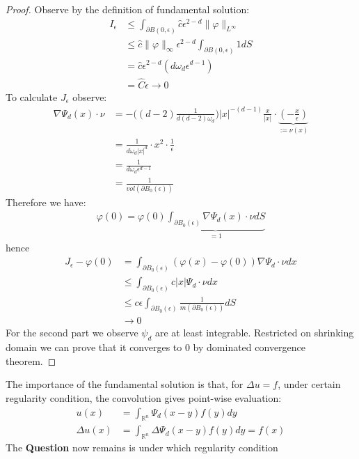\documentclass[a4paper,11pt,oneside,fleqn]{book}
\theoremstyle{definition}
\theoremstyle{remark}
\begin{document}
\begin{proof}
	Observe by the definition of fundamental solution:
	\begin{align*}
		I_\epsilon &\le  \int_{\partial B(0, \epsilon)} \hat{c} \epsilon^{2 - d} \|\varphi\|_{L^\infty}  \\
		&\leq \hat{c} \|\varphi\|_\infty \epsilon^{2-d} \int_{\partial B(0, \epsilon)} 1 dS\\
		&= \hat{c} \epsilon^{2 - d} (d \omega_{d} \epsilon^{d - 1})\\
		&= \hat{C} \epsilon \rightarrow 0
	\end{align*}
To calculate $J_\epsilon$ observe:
	\begin{align*}
		\nabla \Psi_d(x) \cdot \nu &= -\bigg( (d-2) \frac{1}{d(d-2)\omega_d} \bigg) |x|^{-(d-1)}  \frac{x}{|x|} \cdot \underbrace{ (-\frac{x}{\epsilon}) }_{:= \nu(x)}\\
		&= \frac{1}{d\omega_d |x|^d} \cdot x^2 \cdot \frac{1}{\epsilon}\\
		&= \frac{1}{d\omega_d \epsilon^{d - 1} }\\
		&= \frac{1}{vol(\partial B_0(\epsilon))}
	\end{align*}
	Therefore we have:
	\begin{align*}
		\varphi(0) = \varphi(0) \underbrace{ \int_{\partial B_0(\epsilon)} \nabla \Psi_d(x) \cdot \nu dS}_{ = 1}
	\end{align*}
	hence
	\begin{align*}
		J_\epsilon - \varphi(0) &= \int_{\partial B_0(\epsilon)} (\varphi(x) - \varphi(0)) \nabla \Psi_d \cdot \nu dx\\
		&\leq \int_{\partial B_0(\epsilon)} c |x|\Psi_d \cdot \nu dx\\
		&\leq c\epsilon \int_{\partial B_0(\epsilon)} \frac{1}{m(\partial B_0(\epsilon))}d S\\
		&\rightarrow 0
	\end{align*}
	For the second part we observe $\psi_d$ are at least integrable. Restricted on shrinking domain we can prove that it converges to 0 by dominated convergence theorem. 
\end{proof} 

The importance of the fundamental solution is that, for $\Delta u = f$, under certain regularity condition, the convolution gives point-wise evaluation:
\begin{align*}
	u(x) &= \int_{\mathbb{R}^n} \Psi_d(x - y) f(y) dy\\
	\Delta u(x) &= \int_{\mathbb{R}^n} \Delta \Psi_d (x - y) f(y) dy = f(x)
\end{align*}
The \textbf{Question} now remains is under which regularity condition
\end{document}
